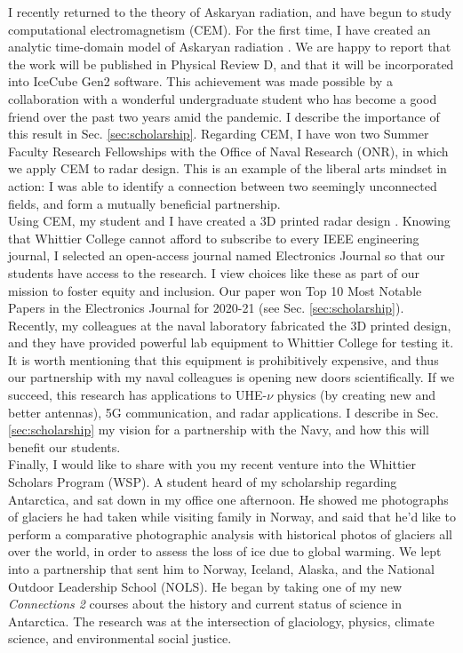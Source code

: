 \documentclass[../../main.tex]{subfiles}
\begin{document}
I recently returned to the theory of Askaryan radiation, and have begun to study computational electromagnetism (CEM).  For the first time, I have created an analytic time-domain model of Askaryan radiation \cite{time}.  We are happy to report that the work will be published in Physical Review D, and that it will be incorporated into IceCube Gen2 software.  This achievement was made possible by a collaboration with a wonderful undergraduate student who has become a good friend over the past two years amid the pandemic.  I describe the importance of this result in Sec. \ref{sec:scholarship}.  Regarding CEM, I have won two Summer Faculty Research Fellowships with the Office of Naval Research (ONR), in which we apply CEM to radar design.  This is an example of the liberal arts mindset in action: I was able to identify a connection between two seemingly unconnected fields, and form a mutually beneficial partnership.
\\
\vspace{0.25cm}
Using CEM, my student and I have created a 3D printed radar design \cite{10.1016/j.cpc.2009.11.008}.  Knowing that Whittier College cannot afford to subscribe to every IEEE engineering journal, I selected an open-access journal named Electronics Journal so that our students have access to the research.  I view choices like these as part of our mission to foster equity and inclusion.  Our paper won Top 10 Most Notable Papers in the Electronics Journal for 2020-21 (see Sec. \ref{sec:scholarship}).  Recently, my colleagues at the naval laboratory fabricated the 3D printed design, and they have provided powerful lab equipment to Whittier College for testing it.  It is worth mentioning that this equipment is prohibitively expensive, and thus our partnership with my naval colleagues is opening new doors scientifically.  If we succeed, this research has applications to UHE-$\nu$ physics (by creating new and better antennas), 5G communication, and radar applications.  I describe in Sec. \ref{sec:scholarship} my vision for a partnership with the Navy, and how this will benefit our students.
\\
\vspace{0.25cm}
Finally, I would like to share with you my recent venture into the Whittier Scholars Program (WSP).  A student heard of my scholarship regarding Antarctica, and sat down in my office one afternoon.  He showed me photographs of glaciers he had taken while visiting family in Norway, and said that he'd like to perform a comparative photographic analysis with historical photos of glaciers all over the world, in order to assess the loss of ice due to global warming.  We lept into a partnership that sent him to Norway, Iceland, Alaska, and the National Outdoor Leadership School (NOLS).  He began by taking one of my new \textit{Connections 2} courses about the history and current status of science in Antarctica.  The research was at the intersection of glaciology, physics, climate science, and environmental social justice.
\end{document}
